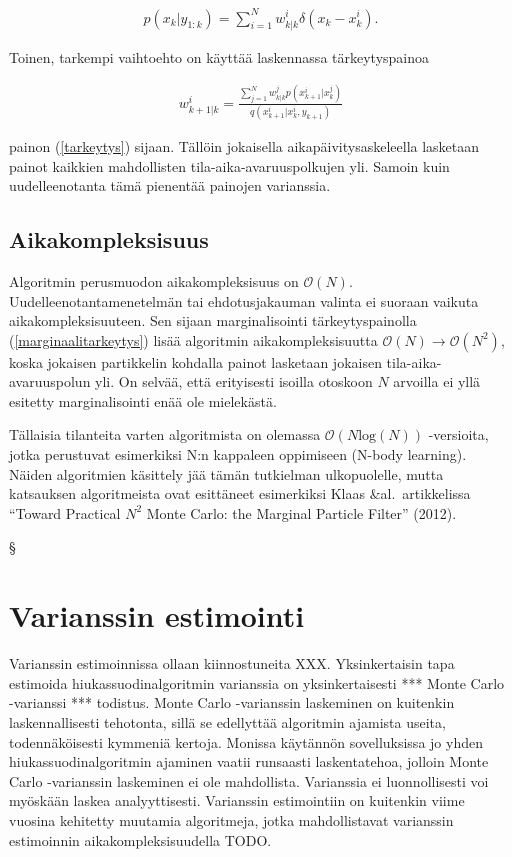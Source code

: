\documentclass[
  12pt,
  a4paper, twoside]{book}
\begin{document}
\begin{align}
\hat{p}(x_{k}|y_{1:k})=\sum_{i=1}^{N}w_{k|k}^i \delta(x_{k}-x_{k}^i).
\end{align}

Toinen, tarkempi vaihtoehto on käyttää laskennassa tärkeytyspainoa

\begin{align}\label{marginaalitarkeytys}
w_{k+1|k}^i=\frac{\sum_{j=1}^{N}w_{k|k}^jp(x_{k+1}^i|x_k^j)}{q(x_{k+1}^i|x_k^i,y_{k+1})}
\end{align}

\noindent painon (\ref{tarkeytys}) sijaan. Tällöin jokaisella aikapäivitysaskeleella lasketaan painot kaikkien mahdollisten tila-aika-avaruuspolkujen yli. Samoin kuin uudelleenotanta tämä pienentää painojen varianssia.

\subsection{Aikakompleksisuus}

Algoritmin perusmuodon aikakompleksisuus on \(\mathcal{O}(N)\). Uudelleenotantamenetelmän tai ehdotusjakauman valinta ei suoraan vaikuta aikakompleksisuuteen. Sen sijaan marginalisointi tärkeytyspainolla (\ref{marginaalitarkeytys}) lisää algoritmin aikakompleksisuutta \(\mathcal{O}(N)\rightarrow\mathcal{O}(N^2)\), koska jokaisen partikkelin kohdalla painot lasketaan jokaisen tila-aika-avaruuspolun yli. On selvää, että erityisesti isoilla otoskoon \(N\) arvoilla ei yllä esitetty marginalisointi enää ole mielekästä.

Tällaisia tilanteita varten algoritmista on olemassa \(\mathcal{O}(N\text{log}(N))\) -versioita, jotka perustuvat esimerkiksi N:n kappaleen oppimiseen (N-body learning). Näiden algoritmien käsittely jää tämän tutkielman ulkopuolelle, mutta katsauksen algoritmeista ovat esittäneet esimerkiksi Klaas \&al.~artikkelissa ``Toward Practical \(N^2\) Monte Carlo: the Marginal Particle Filter'' (2012).

§

\section{Varianssin estimointi}

Varianssin estimoinnissa ollaan kiinnostuneita XXX. Yksinkertaisin tapa estimoida hiukassuodinalgoritmin varianssia on yksinkertaisesti *** Monte Carlo -varianssi *** todistus. Monte Carlo -varianssin laskeminen on kuitenkin laskennallisesti tehotonta, sillä se edellyttää algoritmin ajamista useita, todennäköisesti kymmeniä kertoja. Monissa käytännön sovelluksissa jo yhden hiukassuodinalgoritmin ajaminen vaatii runsaasti laskentatehoa, jolloin Monte Carlo -varianssin laskeminen ei ole mahdollista. Varianssia ei luonnollisesti voi myöskään laskea analyyttisesti. Varianssin estimointiin on kuitenkin viime vuosina kehitetty muutamia algoritmeja, jotka mahdollistavat varianssin estimoinnin aikakompleksisuudella TODO.
\end{document}
